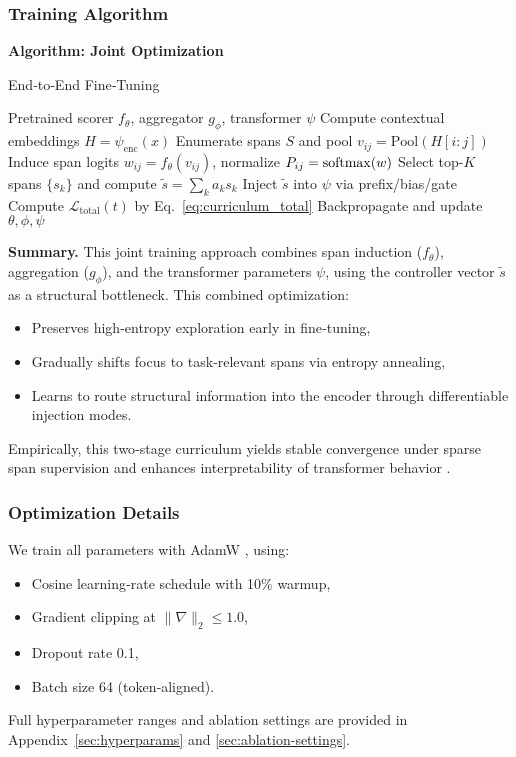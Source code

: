 \subsubsection{Training Algorithm}
\label{sec:training-algorithm}

\medskip
\noindent\textbf{Algorithm: Joint Optimization}

\begin{algorithm}[H]
	\caption{End‐to‐End Fine‐Tuning}
	\label{alg:e2e_finetuning}
	\begin{algorithmic}[1]
		\REQUIRE Pretrained scorer \(f_\theta\), aggregator \(g_\phi\), transformer \(\psi\)
		\STATE Compute contextual embeddings \(H = \psi_{\mathrm{enc}}(x)\)
		\STATE Enumerate spans \(S\) and pool \(v_{ij} = \mathrm{Pool}(H[i:j])\)
		\STATE Induce span logits \(w_{ij}=f_\theta(v_{ij})\), normalize 
		\(P_{ij}=\mathrm{softmax}(w)\)
		\STATE Select top-\(K\) spans \(\{s_k\}\) and compute \(\tilde{s}=\sum_k a_k s_k\)
		\STATE Inject \(\tilde{s}\) into \(\psi\) via prefix/bias/gate
		\STATE Compute \(\mathcal{L}_{\mathrm{total}}(t)\) by Eq.~\eqref{eq:curriculum_total}
		\STATE Backpropagate and update \(\theta,\phi,\psi\)
		\ENDFOR
		\ENDFOR
	\end{algorithmic}
\end{algorithm}

\noindent\textbf{Summary.} This joint training approach combines span induction (\(f_\theta\)), aggregation (\(g_\phi\)), and the transformer parameters \(\psi\), using the controller vector \(\tilde{s}\) as a structural bottleneck.  This combined optimization:
\begin{itemize}
	\item Preserves high‐entropy exploration early in fine‐tuning,  
	\item Gradually shifts focus to task‐relevant spans via entropy annealing,  
	\item Learns to route structural information into the encoder through differentiable injection modes.
\end{itemize}
Empirically, this two‐stage curriculum yields stable convergence under sparse span supervision and enhances interpretability of transformer behavior \cite{belinkov2022probing}.

\subsubsection{Optimization Details}
\label{sec:optimization-details}

\medskip
\noindent We train all parameters with AdamW \cite{loshchilov2019decoupled}, using:
\begin{itemize}[leftmargin=1.5em]
	\item Cosine learning‐rate schedule with 10\% warmup,
	\item Gradient clipping at \(\|\nabla\|_2\le1.0\),
	\item Dropout rate 0.1,
	\item Batch size 64 (token‐aligned).
\end{itemize}
Full hyperparameter ranges and ablation settings are provided in Appendix~\ref{sec:hyperparams} and \ref{sec:ablation-settings}.
